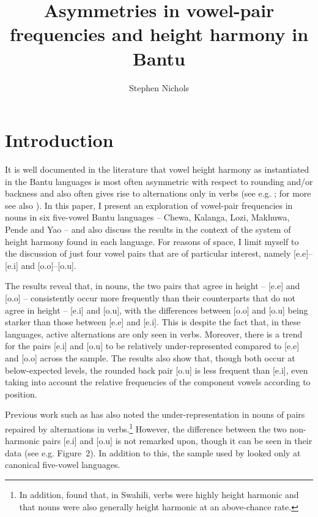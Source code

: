 \documentclass[output=paper]{langscibook}
\author{Stephen Nichols\affiliation{University of Manchester}}
\title{Asymmetries in vowel-pair frequencies and height harmony in Bantu}
\begin{document}
\maketitle

\section{Introduction}\label{sec:nichols:introduction}

It is well documented in the literature that vowel height harmony as instantiated in the Bantu languages is most often asymmetric with respect to rounding and/or backness and also often gives rise to alternations only in verbs (see e.g. \citealt{Hyman99}; for more see also ). In this paper, I present an exploration of vowel-pair frequencies in nouns in six five-vowel Bantu languages -- Chewa, Kalanga, Lozi, Makhuwa, Pende and Yao -- and also discuss the results in the context of the system of height harmony found in each language. For reasons of space, I limit myself to the discussion of just four vowel pairs that are of particular interest, namely [e.e]--[e.i] and [o.o]--[o.u].

The results reveal that, in nouns, the two pairs that agree in height -- [e.e] and [o.o] -- consistently occur more frequently than their counterparts that do not agree in height -- [e.i] and [o.u], with the differences between [o.o] and [o.u] being starker than those between [e.e] and [e.i]. This is despite the fact that, in these languages, active alternations are only seen in verbs. Moreover, there is a trend for the pairs [e.i] and [o.u] to be relatively under-represented compared to [e.e] and [o.o] across the sample. The results also show that, though both occur at below-expected levels, the rounded back pair [o.u] is less frequent than [e.i], even taking into account the relative frequencies of the component vowels according to position.

Previous work such as \citet{Archangeli12b} has also noted the under-representation in nouns of pairs repaired by alternations in verbs.\footnote{In addition, \citet{VHCalc} found that, in Swahili, verbs were highly height harmonic and that nouns were also generally height harmonic at an above-chance rate.} However, the difference between the two non-harmonic pairs [e.i] and [o.u] is not remarked upon, though it can be seen in their data (see e.g. Figure~2). In addition to this, the sample used by \citet{Archangeli12b} looked only at canonical five-vowel languages.
\end{document}
